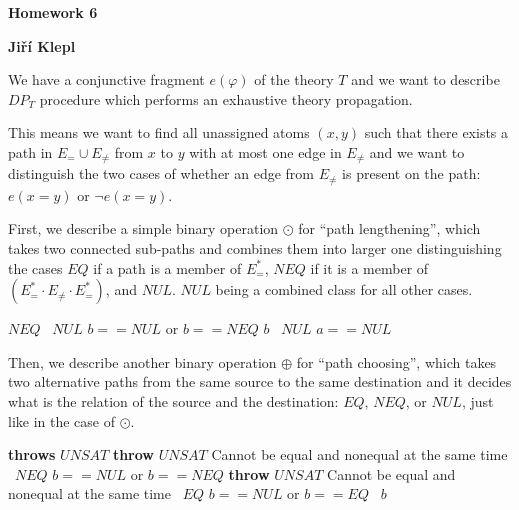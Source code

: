\documentclass[a4paper,12pt]{article} %
\begin{document}
\begin{center}
    {\Large \bf Homework 6}
    \vspace{2mm}

    {\bf Jiří Klepl}

\end{center}

\vspace{0.4cm}

We have a conjunctive fragment $e(\varphi)$ of the theory $T$ and we want to describe $DP_T$ procedure which performs an exhaustive theory propagation.

This means we want to find all unassigned atoms $(x, y)$ such that there exists a path in $E_= \cup E_{\neq}$ from $x$ to $y$ with at most one edge in $E_{\neq}$ and we want to distinguish the two cases of whether an edge from $E_{\neq}$ is present on the path: $e(x = y)$ or $\neg e(x = y)$.

First, we describe a simple binary operation $\odot$ for ``path lengthening'', which takes two connected sub-paths and combines them into larger one distinguishing the cases $EQ$ if a path is a member of $E_=^*$, $NEQ$ if it is a member of $(E_=^* \cdot E_{\neq} \cdot E_=^*)$, and $NUL$. $NUL$ being a combined class for all other cases.

\begin{algorithmic}[1]
            \Return $NEQ$
        \Else
            \ \Return $NUL$ \Comment $b == NUL$ or $b == NEQ$ 
        \EndIf
        \Return $b$
    \Else
        \ \Return $NUL$ \Comment $a == NUL$ 
    \EndIf
    \EndFunction
\end{algorithmic}

Then, we describe another binary operation $\oplus$ for ``path choosing'', which takes two alternative paths from the same source to the same destination and it decides what is the relation of the source and the destination: $EQ$, $NEQ$, or $NUL$, just like in the case of $\odot$.

\begin{algorithmic}[1]
     \textbf{throws} $UNSAT$
            \State \textbf{throw} $UNSAT$ \Comment Cannot be equal and nonequal at the same time
        \Else
            \ \Return $NEQ$ \Comment $b == NUL$ or $b == NEQ$ 
        \EndIf
            \State \textbf{throw} $UNSAT$ \Comment Cannot be equal and nonequal at the same time
        \Else
            \ \Return $EQ$ \Comment $b == NUL$ or $b == EQ$ 
        \EndIf
    \Else
        \ \Return $b$
    \EndIf
    \EndFunction
\end{algorithmic}
\end{document}
